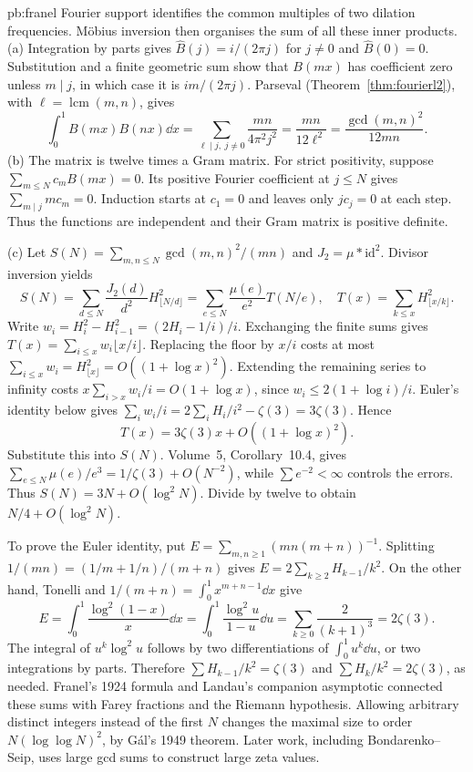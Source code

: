 \begin{solution}{pb:franel}
\idea Fourier support identifies the common multiples of two dilation frequencies. Möbius inversion then organises the sum of all these inner products.
\writeup (a) Integration by parts gives $\hat B(j)=i/(2\pi j)$ for $j\ne0$ and $\hat B(0)=0$. Substitution and a finite geometric sum show that $B(mx)$ has coefficient zero unless $m\mid j$, in which case it is $im/(2\pi j)$. Parseval (Theorem~\ref{thm:fourierl2}), with $\ell=\operatorname{lcm}(m,n)$, gives
\[\int_0^1B(mx)B(nx)\dd x
 =\sum_{\ell\mid j,\ j\ne0}\frac{mn}{4\pi^2j^2}
 =\frac{mn}{12\ell^2}=\frac{\gcd(m,n)^2}{12mn}.
\]
(b) The matrix is twelve times a Gram matrix. For strict positivity, suppose $\sum_{m\le N}c_mB(mx)=0$. Its positive Fourier coefficient at $j\le N$ gives $\sum_{m\mid j}mc_m=0$. Induction starts at $c_1=0$ and leaves only $jc_j=0$ at each step. Thus the functions are independent and their Gram matrix is positive definite.

(c) Let $S(N)=\sum_{m,n\le N}\gcd(m,n)^2/(mn)$ and $J_2=\mu*\mathrm{id}^2$. Divisor inversion yields
\[S(N)=\sum_{d\le N}\frac{J_2(d)}{d^2}H_{\lfloor N/d\rfloor}^2
 =\sum_{e\le N}\frac{\mu(e)}{e^2}T(N/e),\quad T(x)=\sum_{k\le x}H_{\lfloor x/k\rfloor}^2.
\]
Write $w_i=H_i^2-H_{i-1}^2=(2H_i-1/i)/i$. Exchanging the finite sums gives $T(x)=\sum_{i\le x}w_i\lfloor x/i\rfloor$. Replacing the floor by $x/i$ costs at most $\sum_{i\le x}w_i=H_{\lfloor x\rfloor}^2=O((1+\log x)^2)$. Extending the remaining series to infinity costs $x\sum_{i>x}w_i/i=O(1+\log x)$, since $w_i\le2(1+\log i)/i$. Euler's identity below gives $\sum_iw_i/i=2\sum_iH_i/i^2-\zeta(3)=3\zeta(3)$. Hence
\[T(x)=3\zeta(3)x+O((1+\log x)^2).
\]
Substitute this into $S(N)$. Volume~5, Corollary~10.4, gives $\sum_{e\le N}\mu(e)/e^3=1/\zeta(3)+O(N^{-2})$, while $\sum e^{-2}<\infty$ controls the errors. Thus $S(N)=3N+O(\log^2N)$. Divide by twelve to obtain $N/4+O(\log^2N)$.

To prove the Euler identity, put $E=\sum_{m,n\ge1}(mn(m+n))^{-1}$. Splitting $1/(mn)=(1/m+1/n)/(m+n)$ gives $E=2\sum_{k\ge2}H_{k-1}/k^2$. On the other hand, Tonelli and $1/(m+n)=\int_0^1x^{m+n-1}\dd x$ give
\[E=\int_0^1\frac{\log^2(1-x)}x\dd x
 =\int_0^1\frac{\log^2u}{1-u}\dd u
 =\sum_{k\ge0}\frac2{(k+1)^3}=2\zeta(3).
\]
The integral of $u^k\log^2u$ follows by two differentiations of $\int_0^1u^k\dd u$, or two integrations by parts. Therefore $\sum H_{k-1}/k^2=\zeta(3)$ and $\sum H_k/k^2=2\zeta(3)$, as needed.
\leads Franel's 1924 formula and Landau's companion asymptotic connected these sums with Farey fractions and the Riemann hypothesis. Allowing arbitrary distinct integers instead of the first $N$ changes the maximal size to order $N(\log\log N)^2$, by Gál's 1949 theorem. Later work, including Bondarenko--Seip, uses large gcd sums to construct large zeta values.
\end{solution}

